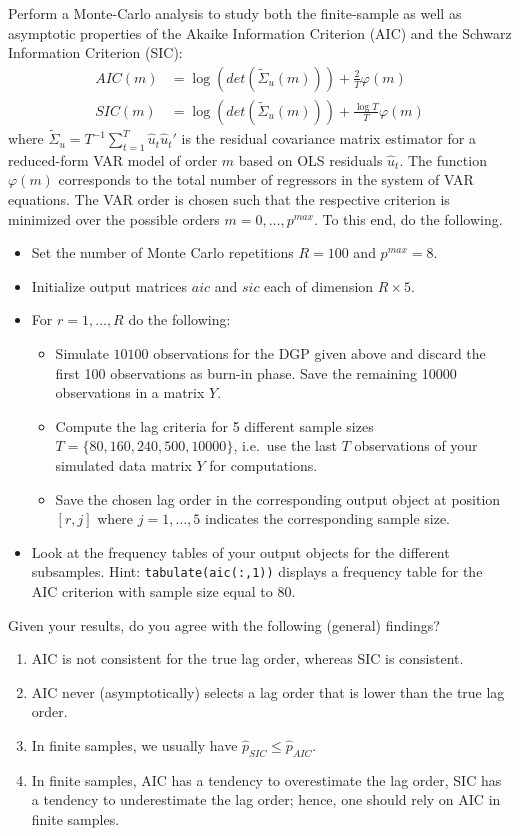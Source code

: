 \documentclass{article}
\begin{document}
Perform a Monte-Carlo analysis to study both the finite-sample as well as asymptotic properties
of the Akaike Information Criterion (AIC) and the Schwarz Information Criterion (SIC):
\begin{align*}
AIC(m)  &= \log(det(\tilde{\Sigma}_u(m))) + \frac{2}{T}\varphi(m)\\
SIC(m)  &= \log(det(\tilde{\Sigma}_u(m))) + \frac{\log T}{T}\varphi(m)
\end{align*}
where \(\tilde{\Sigma}_u=T^{-1}\sum_{t=1}^T \hat{u}_t\hat{u}_t'\) is the residual covariance matrix estimator
for a reduced-form VAR model of order $m$ based on OLS residuals \(\hat{u}_t\).
The function \(\varphi(m)\) corresponds to the total number of regressors in the system of VAR equations.
The VAR order is chosen such that the respective criterion is minimized over the possible orders \(m = 0,\ldots,p^{max}\).
To this end, do the following.

\begin{itemize}
	\item Set the number of Monte Carlo repetitions \(R=100\) and \(p^{max}=8\).
	\item Initialize output matrices \(aic\) and \(sic\) each of dimension \(R \times 5\).
	\item For \(r=1,\ldots,R\) do the following:
	\begin{itemize}
		\item Simulate \(10100\) observations for the DGP given above and discard the first 100 observations as burn-in phase.
		Save the remaining 10000 observations in a matrix \(Y\).
		\item Compute the lag criteria for 5 different sample sizes \(T=\{80, 160, 240, 500, 10000\} \),
		i.e.\ use the last \(T\) observations of your simulated data matrix \(Y\) for computations.
		\item Save the chosen lag order in the corresponding output object at position \([r,j]\) where \(j=1,\ldots,5\) indicates the corresponding sample size.
	\end{itemize}
	\item Look at the frequency tables of your output objects for the different subsamples. Hint: \texttt{tabulate(aic(:,1))} displays a frequency table for the AIC criterion with sample size equal to 80.
\end{itemize}
Given your results, do you agree with the following (general) findings?
\begin{enumerate}
	\item AIC is not consistent for the true lag order, whereas SIC is consistent.
	\item AIC never (asymptotically) selects a lag order that is lower than the true lag order.
	\item In finite samples, we usually have \(\hat{p}_{SIC} \leq \hat{p}_{AIC}\).
	\item In finite samples, AIC has a tendency to overestimate the lag order, SIC has a tendency to underestimate the lag order; hence, one should rely on AIC in finite samples.
\end{enumerate}
\end{document}
